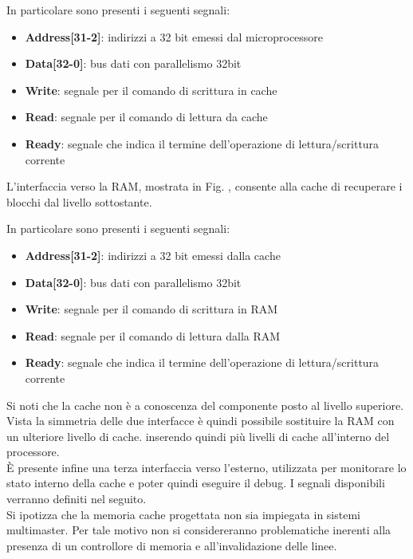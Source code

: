 In particolare sono presenti i seguenti segnali:
\begin{itemize} %
\item \textbf{Address[31-2]}: indirizzi a 32 bit emessi dal microprocessore
\item \textbf{Data[32-0]}: bus dati con parallelismo 32bit 
\item \textbf{Write}: segnale per il comando di scrittura in cache
\item \textbf{Read}: segnale per il comando di lettura da cache
\item \textbf{Ready}: segnale che indica il termine dell'operazione di lettura/scrittura corrente
\end{itemize}

L'interfaccia verso la RAM, mostrata in Fig. %
, consente alla cache di recuperare i blocchi dal livello sottostante.


In particolare sono presenti i seguenti segnali:
\begin{itemize} %
\item \textbf{Address[31-2]}: indirizzi a 32 bit emessi dalla cache
\item \textbf{Data[32-0]}: bus dati con parallelismo 32bit 
\item \textbf{Write}: segnale per il comando di scrittura in RAM
\item \textbf{Read}: segnale per il comando di lettura dalla RAM
\item \textbf{Ready}: segnale che indica il termine dell'operazione di lettura/scrittura corrente
\end{itemize}

Si noti che la cache non \`e a conoscenza del componente posto al livello superiore. Vista la simmetria delle due interfacce \`e quindi possibile sostituire la RAM con un ulteriore livello di cache. inserendo quindi pi\`u livelli di cache all'interno del processore.\\
\`E presente infine una terza interfaccia verso l'esterno, utilizzata per monitorare lo stato interno della cache e poter quindi eseguire il debug.
I segnali disponibili verranno definiti nel seguito.\\
Si ipotizza che la memoria cache progettata non sia impiegata in sistemi multimaster. Per tale motivo non si considereranno problematiche inerenti alla presenza di un controllore di memoria e all'invalidazione delle linee.










